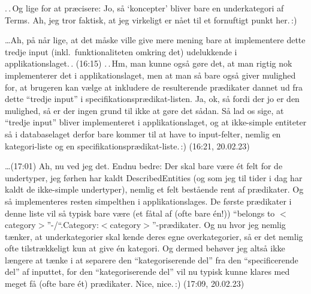 \documentclass{report}
\begin{document}
.\,.\,Og lige for at præcisere: Jo, så `koncepter' bliver bare en underkategori af Terms. Ah, jeg tror faktisk, at jeg virkeligt er nået til et fornuftigt punkt her.\,:) 

\ldots Ah, på når lige, at det måske ville give mere mening bare at implementere dette tredje input (inkl.\ funktionaliteten omkring det) udelukkende i applikationslaget.\,. (16:15) .\,.\,Hm, man kunne også gøre det, at man rigtig nok implementerer det i applikationslaget, men at man så bare også giver mulighed for, at brugeren kan vælge at inkludere de resulterende prædikater dannet ud fra dette ``tredje input'' i specifikationsprædikat-listen. Ja, ok, så fordi der jo er den mulighed, så er der ingen grund til ikke at gøre det sådan. Så lad os sige, at ``tredje input'' bliver implementeret i applikationslaget, og at ikke-simple entiteter så i databaselaget derfor bare kommer til at have to input-felter, nemlig en kategori-liste og en specifikationsprædikat-liste.\,:) (16:21, 20.02.23)

\ldots (17:01) Ah, nu ved jeg det. Endnu bedre: Der skal bare være ét felt for de undertyper, jeg førhen har kaldt DescribedEntities (og som jeg til tider i dag har kaldt de ikke-simple undertyper), nemlig et felt bestående rent af prædikater. Og så implementeres resten simpelthen i applikationslages. De første prædikater i denne liste vil så typisk bare være (et fåtal af (ofte bare én!)) ``belongs to $<$category$>$''-/``.Category:$<$category$>$''-prædikater. Og nu hvor jeg nemlig tænker, at underkategorier skal kende deres egne overkategorier, så er det nemlig ofte tilstrækkeligt kun at give én kategori. Og dermed behøver jeg altså ikke længere at tænke i at separere den ``kategoriserende del'' fra den ``specificerende del'' af inputtet, for den ``kategoriserende del'' vil nu typisk kunne klares med meget få (ofte bare ét) prædikater. Nice, nice.\,:) (17:09, 20.02.23)
\end{document}
